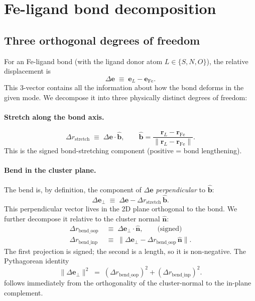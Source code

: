\documentclass[10pt,a4paper,twoside]{article}
\newcommand{\rvec}{\mathbf{r}}
\newcommand{\evec}{\mathbf{e}}
\newcommand{\nhat}{\hat{\mathbf{n}}}
\newcommand{\bhat}{\hat{\mathbf{b}}}
\newcommand{\codref}[1]{%
  \quad\text{\textcolor{gray!70!black}{\footnotesize $\rightsquigarrow$~\texttt{#1}}}}
\begin{document}
\section{Fe-ligand bond decomposition}
\label{sec:fe-ligand-decomp}

\subsection{Three orthogonal degrees of freedom}

\codref{core.analyze\_fe\_ligand}

For an Fe-ligand bond (with the ligand donor atom $L \in \{S, N, O\}$),
the relative displacement is
\begin{equation}
  \Delta\evec \;\equiv\; \evec_L - \evec_{\text{Fe}}.
\end{equation}
This 3-vector contains all the information about how the bond
deforms in the given mode. We decompose it into three physically
distinct degrees of freedom:

\paragraph{Stretch along the bond axis.}
\begin{equation}
  \Delta r_\text{stretch} \;\equiv\; \Delta\evec \cdot \bhat,
  \qquad
  \bhat = \frac{\rvec_L - \rvec_{\text{Fe}}}{\lVert\rvec_L - \rvec_{\text{Fe}}\rVert}.
  \label{eq:fel-stretch}
\end{equation}
This is the signed bond-stretching component (positive = bond
lengthening).

\paragraph{Bend in the cluster plane.}
The bend is, by definition, the component of $\Delta\evec$
\emph{perpendicular} to $\bhat$:
\begin{equation}
  \Delta\evec_\perp
    \;\equiv\;
  \Delta\evec - \Delta r_\text{stretch}\,\bhat.
  \label{eq:fel-perp}
\end{equation}
This perpendicular vector lives in the 2D plane orthogonal to the
bond. We further decompose it relative to the cluster normal
$\nhat$:
\begin{align}
  \Delta r_\text{bend\_oop}
    &\;\equiv\; \Delta\evec_\perp \cdot \nhat,
      \qquad\text{(signed)} \\
  \Delta r_\text{bend\_inp}
    &\;\equiv\;
   \lVert\Delta\evec_\perp - \Delta r_\text{bend\_oop}\,\nhat\rVert.
   \label{eq:fel-bend-split}
\end{align}
The first projection is signed; the second is a length, so it is
non-negative. The Pythagorean identity
\begin{equation}
  \lVert\Delta\evec_\perp\rVert^2
    \;=\; (\Delta r_\text{bend\_oop})^2 + (\Delta r_\text{bend\_inp})^2.
  \label{eq:fel-pythagoras}
\end{equation}
follows immediately from the orthogonality of the cluster-normal to
the in-plane complement.
\end{document}
